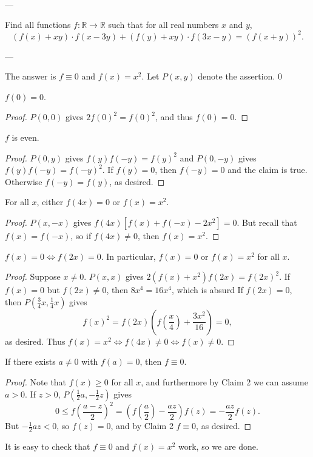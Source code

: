 
---

Find all functions $f:\mathbb R\to\mathbb R$ such that for all real numbers $x$ and $y$, \[(f(x)+xy)\cdot f(x-3y)+(f(y)+xy)\cdot f(3x-y)=(f(x+y))^2.\]

---

The answer is $f\equiv0$ and $f(x)=x^2$.  Let $P(x,y)$ denote the assertion.
\setcounter{iclaim}0
\begin{iclaim}
    $f(0)=0$.
\end{iclaim}
\begin{proof}
    $P(0,0)$ gives $2f(0)^2=f(0)^2$, and thus $f(0)=0$.
\end{proof}
\begin{iclaim}
    $f$ is even.
\end{iclaim}
\begin{proof}
    $P(0,y)$ gives $f(y)f(-y)=f(y)^2$ and $P(0,-y)$ gives $f(y)f(-y)=f(-y)^2$. If $f(y)=0$, then $f(-y)=0$ and the claim is true. Otherwise $f(-y)=f(y)$, as desired.
\end{proof}
\begin{iclaim}
    For all $x$, either $f(4x)=0$ or $f(x)=x^2$.
\end{iclaim}
\begin{proof}
    $P(x,-x)$ gives $f(4x)\left[f(x)+f(-x)-2x^2\right]=0$. But recall that $f(x)=f(-x)$, so if $f(4x)\ne0$, then $f(x)=x^2$.
\end{proof}
\begin{iclaim}
    $f(x)=0\iff f(2x)=0$. In particular, $f(x)=0$ or $f(x)=x^2$ for all $x$.
\end{iclaim}
\begin{proof}
    Suppose $x\ne0$. $P(x,x)$ gives $2\left(f(x)+x^2\right)f(2x)=f(2x)^2$. If $f(x)=0$ but $f(2x)\ne0$, then $8x^4=16x^4$, which is absurd If $f(2x)=0$, then $P(\tfrac34x,\tfrac14x)$ gives \[f(x)^2=f(2x)\left(f\left(\frac x4\right)+\frac{3x^2}{16}\right)=0,\]
    as desired. Thus $f(x)=x^2\iff f(4x)\ne0\iff f(x)\ne0$.
\end{proof}
\begin{iclaim}
    If there exists $a\ne0$ with $f(a)=0$, then $f\equiv0$.
\end{iclaim}
\begin{proof}
    Note that $f(x)\ge0$ for all $x$, and furthermore by Claim 2 we can assume $a>0$. If $z>0$, $P(\tfrac12a,-\tfrac12z)$ gives \[0\le f\left(\frac{a-z}2\right)^2=\left(f\left(\frac a2\right)-\frac{az}2\right)f(z)=-\frac{az}2f(z).\]
    But $-\tfrac12az<0$, so $f(z)=0$, and by Claim 2 $f\equiv0$, as desired.
\end{proof}

It is easy to check that $f\equiv0$ and $f(x)=x^2$ work, so we are done.
